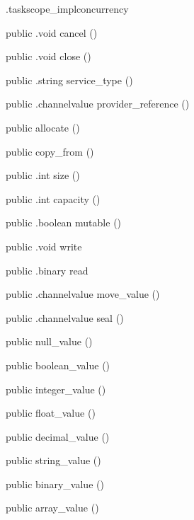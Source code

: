 \begin{CrexxClass}{.taskscope\_impl}{concurrency}
\begin{Members}
    \Method
      {public}
      {.void}
      {cancel}
      {()}

    \Method
      {public}
      {.void}
      {close}
      {()}

    \Method
      {public}
      {.string}
      {service\_type}
      {()}

    \Method
      {public}
      {.channelvalue}
      {provider\_reference}
      {()}

    \Factory
      {public}
      {allocate}
      {()}

    \Factory
      {public}
      {copy\_from}
      {()}

    \Method
      {public}
      {.int}
      {size}
      {()}

    \Method
      {public}
      {.int}
      {capacity}
      {()}

    \Method
      {public}
      {.boolean}
      {mutable}
      {()}

    \Method
      {public}
      {.void}
      {write}
      {}

    \Method
      {public}
      {.binary}
      {read}
      {}

    \Method
      {public}
      {.channelvalue}
      {move\_value}
      {()}

    \Method
      {public}
      {.channelvalue}
      {seal}
      {()}

    \Factory
      {public}
      {null\_value}
      {()}

    \Factory
      {public}
      {boolean\_value}
      {()}

    \Factory
      {public}
      {integer\_value}
      {()}

    \Factory
      {public}
      {float\_value}
      {()}

    \Factory
      {public}
      {decimal\_value}
      {()}

    \Factory
      {public}
      {string\_value}
      {()}

    \Factory
      {public}
      {binary\_value}
      {()}

    \Factory
      {public}
      {array\_value}
      {()}


\end{Members}
\end{CrexxClass}
